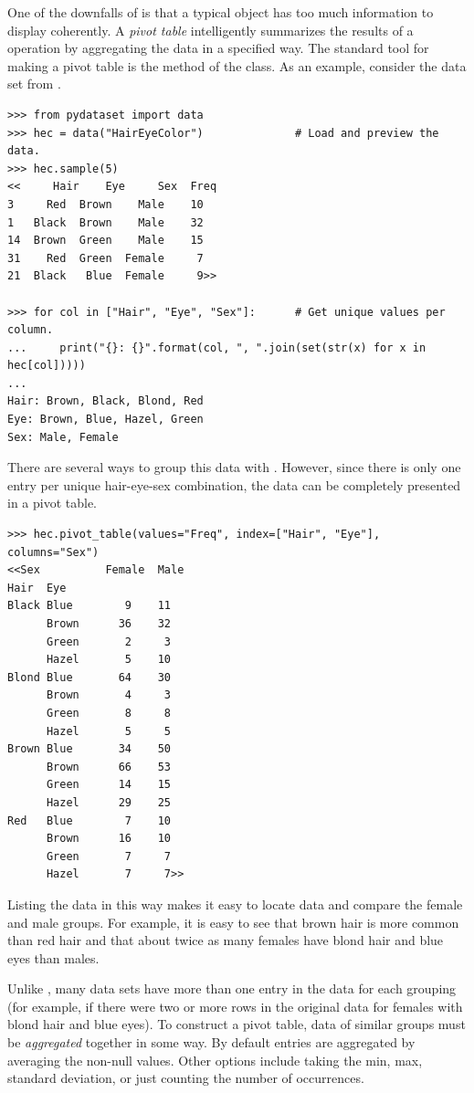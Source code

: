 One of the downfalls of  is that a typical  object has too much information to display coherently.
A \emph{pivot table} intelligently summarizes the results of a  operation by aggregating the data in a specified way.
The standard tool for making a pivot table is the  method of the  class.
As an example, consider the  data set from .

\begin{lstlisting}
>>> from pydataset import data
>>> hec = data("HairEyeColor")              # Load and preview the data.
>>> hec.sample(5)
<<     Hair    Eye     Sex  Freq
3     Red  Brown    Male    10
1   Black  Brown    Male    32
14  Brown  Green    Male    15
31    Red  Green  Female     7
21  Black   Blue  Female     9>>

>>> for col in ["Hair", "Eye", "Sex"]:      # Get unique values per column.
...     print("{}: {}".format(col, ", ".join(set(str(x) for x in hec[col]))))
...
Hair: Brown, Black, Blond, Red
Eye: Brown, Blue, Hazel, Green
Sex: Male, Female
\end{lstlisting}

There are several ways to group this data with .
However, since there is only one entry per unique hair-eye-sex combination, the data can be completely presented in a pivot table.

\begin{lstlisting}
>>> hec.pivot_table(values="Freq", index=["Hair", "Eye"], columns="Sex")
<<Sex          Female  Male
Hair  Eye
Black Blue        9    11
      Brown      36    32
      Green       2     3
      Hazel       5    10
Blond Blue       64    30
      Brown       4     3
      Green       8     8
      Hazel       5     5
Brown Blue       34    50
      Brown      66    53
      Green      14    15
      Hazel      29    25
Red   Blue        7    10
      Brown      16    10
      Green       7     7
      Hazel       7     7>>
\end{lstlisting}

Listing the data in this way makes it easy to locate data and compare the female and male groups.
For example, it is easy to see that brown hair is more common than red hair and that about twice as many females have blond hair and blue eyes than males.

Unlike , many data sets have more than one entry in the data for each grouping (for example, if there were two or more rows in the original data for females with blond hair and blue eyes).
To construct a pivot table, data of similar groups must be \emph{aggregated} together in some way.
By default entries are aggregated by averaging the non-null values.
Other options include taking the min, max, standard deviation, or just counting the number of occurrences.

